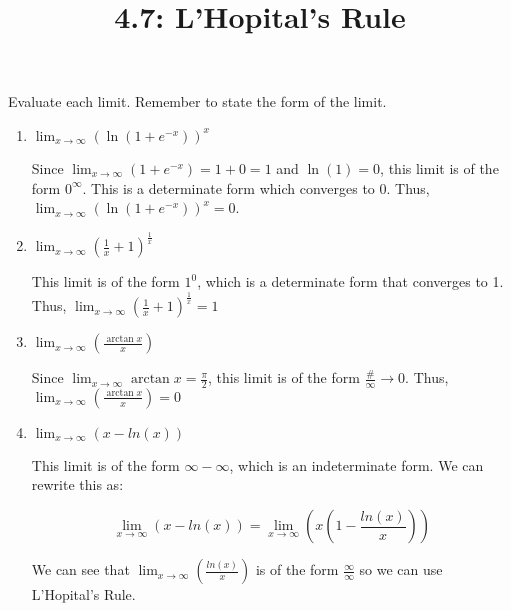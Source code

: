 \documentclass[nooutcomes,handout]{ximera}
\title{4.7: L'Hopital's Rule}
\begin{document}
\begin{abstract}
\end{abstract}
\maketitle

\begin{problem}

Evaluate each limit.  Remember to state the form of the limit.
  \begin{enumerate}
  \item  $\lim_{x \to \infty}\left( \ln (1 + e^{-x}) \right)^x $
    \begin{freeResponse}
      Since $\lim_{x \to \infty} (1 + e^{-x}) = 1 + 0 = 1$ and $\ln (1) = 0$, this limit is of the form $0^{\infty}$.
      This is a determinate form which converges to $0$.
      Thus, $\lim_{x \to \infty} \left( \ln (1 + e^{-x}) \right)^x = 0$.
    \end{freeResponse}
    
  \item  $\lim_{x \to \infty} \left( \frac{1}{x} + 1 \right)^{\frac{1}{x}} $
    \begin{freeResponse}
      This limit is of the form $1^0$, which is a determinate form that converges to 1.
      Thus, $\lim_{x \to \infty} \left( \frac{1}{x} + 1 \right)^{\frac{1}{x}} = 1 $
    \end{freeResponse}
    
  \item  $\lim_{x \to \infty} \left( \frac{\arctan x}{x} \right) $
    \begin{freeResponse}
      Since $\lim_{x \to \infty} \arctan x = \frac{\pi}{2}$, this limit is of the form $\frac{\text{\#}}{\infty} \to 0$.
      Thus, $\lim_{x \to \infty} \left( \frac{\arctan x}{x} \right) = 0$  
    \end{freeResponse}
    
  \item  $\lim_{x \to \infty} (x-ln(x)) $
    \begin{freeResponse}
      This limit is of the form $\infty - \infty$, which is an indeterminate form.  We can rewrite this as:
   
      $$\lim_{x \to \infty} (x-ln(x))= \lim_{x \to \infty} \left(x\left(1-\frac{ln(x)}{x}\right)\right)$$
     
     We can see that $\lim_{x \to \infty}\left(\frac{ln(x)}{x}\right)$ is of the form $\frac{\infty}{\infty}$ so we can use L'Hopital's Rule.
     

\end{freeResponse}
\end{enumerate}
\end{problem}
\end{document}
